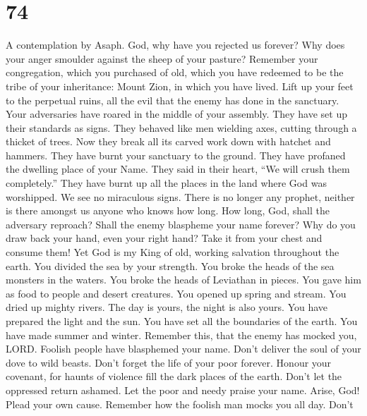 \hypertarget{section-72}{%
\section{74}\label{section-72}}

A contemplation by Asaph.  God, why have you rejected us
forever? Why does your anger smoulder against the sheep of your pasture?
 Remember your congregation, which you purchased of old,
which you have redeemed to be the tribe of your inheritance: Mount Zion,
in which you have lived.  Lift up your feet to the perpetual
ruins, all the evil that the enemy has done in the sanctuary.
 Your adversaries have roared in the middle of your
assembly. They have set up their standards as signs.  They
behaved like men wielding axes, cutting through a thicket of trees.
 Now they break all its carved work down with hatchet and
hammers.  They have burnt your sanctuary to the ground. They
have profaned the dwelling place of your Name.  They said in
their heart, ``We will crush them completely.'' They have burnt up all
the places in the land where God was worshipped.  We see no
miraculous signs. There is no longer any prophet, neither is there
amongst us anyone who knows how long.  How long, God, shall
the adversary reproach? Shall the enemy blaspheme your name forever?
 Why do you draw back your hand, even your right hand? Take
it from your chest and consume them!  Yet God is my King of
old, working salvation throughout the earth.  You divided
the sea by your strength. You broke the heads of the sea monsters in the
waters.  You broke the heads of Leviathan in pieces. You
gave him as food to people and desert creatures.  You
opened up spring and stream. You dried up mighty rivers. 
The day is yours, the night is also yours. You have prepared the light
and the sun.  You have set all the boundaries of the earth.
You have made summer and winter.  Remember this, that the
enemy has mocked you, LORD. Foolish people have blasphemed your name.
 Don't deliver the soul of your dove to wild beasts. Don't
forget the life of your poor forever.  Honour your
covenant, for haunts of violence fill the dark places of the earth.
 Don't let the oppressed return ashamed. Let the poor and
needy praise your name.  Arise, God! Plead your own cause.
Remember how the foolish man mocks you all day.  Don't
